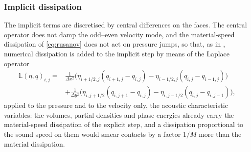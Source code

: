 \documentclass[a4paper,fleqn]{cas-sc}
\begin{document}
\subsubsection{Implicit dissipation}
\label{sec:dissipation}
The implicit terms are discretised by central differences on the faces. The central operator does not damp the
odd--even velocity mode, and the material-speed dissipation of \eqref{eq:rusanov} does not act on pressure jumps, so that,
as in \cite{DumbserCasulli2016,BoscheriPareschi2021}, numerical dissipation is added to the implicit step by means of the Laplace operator
\begin{equation}
\begin{aligned}
\mathbb L(\eta,q)_{i,j}=&\frac1{\Delta x^2}\Big(\eta_{i+1/2,j}(q_{i+1,j}-q_{i,j})-\eta_{i-1/2,j}(q_{i,j}-q_{i-1,j})\Big)\\
&+\frac1{\Delta y^2}\Big(\eta_{i,j+1/2}(q_{i,j+1}-q_{i,j})-\eta_{i,j-1/2}(q_{i,j}-q_{i,j-1})\Big),
\end{aligned}
\label{eq:laplace}
\end{equation}
applied to the pressure and to the velocity only, the acoustic characteristic variables: the volumes, partial densities and
phase energies already carry the material-speed dissipation of the explicit step, and a dissipation proportional to the
sound speed on them would smear contacts by a factor $1/M$ more than the material dissipation.
\end{document}
